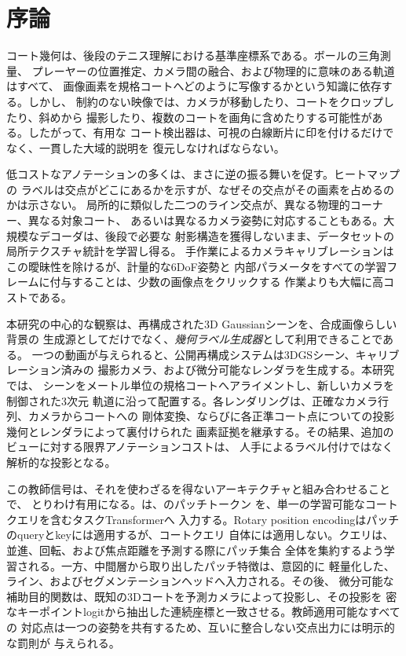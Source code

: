 \section{序論}
\label{sec:introduction}

コート幾何は、後段のテニス理解における基準座標系である。ボールの三角測量、
プレーヤーの位置推定、カメラ間の融合、および物理的に意味のある軌道はすべて、
画像画素を規格コートへどのように写像するかという知識に依存する。しかし、
制約のない映像では、カメラが移動したり、コートをクロップしたり、斜めから
撮影したり、複数のコートを画角に含めたりする可能性がある。したがって、有用な
コート検出器は、可視の白線断片に印を付けるだけでなく、一貫した大域的説明を
復元しなければならない。

低コストなアノテーションの多くは、まさに逆の振る舞いを促す。ヒートマップの
ラベルは交点がどこにあるかを示すが、なぜその交点がその画素を占めるのかは示さない。
局所的に類似した二つのライン交点が、異なる物理的コーナー、異なる対象コート、
あるいは異なるカメラ姿勢に対応することもある。大規模なデコーダは、後段で必要な
射影構造を獲得しないまま、データセットの局所テクスチャ統計を学習し得る。
手作業によるカメラキャリブレーションはこの曖昧性を除けるが、計量的な6DoF姿勢と
内部パラメータをすべての学習フレームに付与することは、少数の画像点をクリックする
作業よりも大幅に高コストである。

本研究の中心的な観察は、再構成された3D Gaussianシーンを、合成画像らしい背景の
生成源としてだけでなく、\emph{幾何ラベル生成器}として利用できることである。
一つの動画が与えられると、公開再構成システムは3DGSシーン、キャリブレーション済みの
撮影カメラ、および微分可能なレンダラを生成する\citep{kerbl2023gaussian}。本研究では、
シーンをメートル単位の規格コートへアライメントし、新しいカメラを制御された3次元
軌道に沿って配置する。各レンダリングは、正確なカメラ行列、カメラからコートへの
剛体変換、ならびに各正準コート点についての投影幾何とレンダラによって裏付けられた
画素証拠を継承する。その結果、追加のビューに対する限界アノテーションコストは、
人手によるラベル付けではなく解析的な投影となる。

この教師信号は、それを使わざるを得ないアーキテクチャと組み合わせることで、
とりわけ有用になる。\Method{}は、\DINO{}のパッチトークン
\citep{simeoni2025dinov3}を、単一の学習可能なコートクエリを含むタスクTransformerへ
入力する。Rotary position encodingはパッチのqueryとkeyには適用するが、コートクエリ
自体には適用しない。クエリは、並進、回転、および焦点距離を予測する際にパッチ集合
全体を集約するよう学習される。一方、中間層から取り出したパッチ特徴は、意図的に
軽量化した\KP{}、ライン、およびセグメンテーションヘッドへ入力される。その後、
微分可能な補助目的関数は、既知の3Dコートを予測カメラによって投影し、その投影を
密なキーポイントlogitから抽出した連続座標と一致させる。教師適用可能なすべての
対応点は一つの姿勢を共有するため、互いに整合しない交点出力には明示的な罰則が
与えられる。

